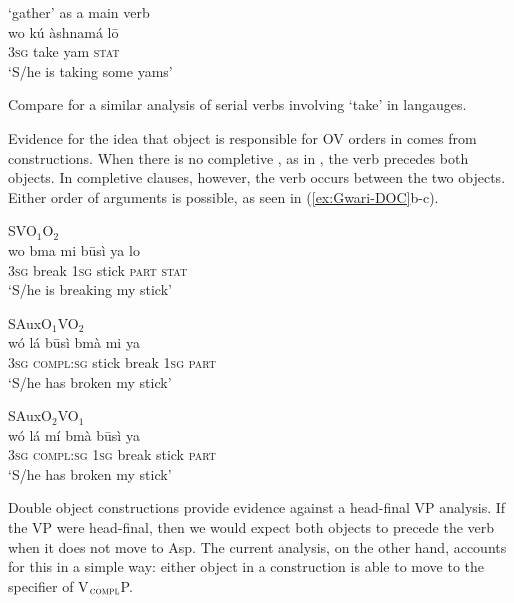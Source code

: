 \documentclass[output=paper,newtxmath,modfonts,nonflat,draftmode]{langsci/langscibook}
\begin{document}
\ex \label{ex:Gwari-gather} { `gather' as a main verb}	\\
\gll wo kú àshnamá l{\=o}\\
3\textsc{sg} take yam \textsc{stat}\\
\glt `S/he is taking some yams' \hfill \citep[][93]{hyman1970}
\z
\z

Compare \citet{aboh09} for a similar analysis of serial verbs involving `take' in  langauges.

Evidence for the idea that object  is responsible for OV orders in  comes from  constructions. When there is no completive , as in , the verb precedes both objects. In completive clauses, however, the verb occurs between the two objects. Either order of arguments is possible, as seen in (\ref{ex:Gwari-DOC}b-c). 

\ea \label{ex:Gwari-DOC}

\ea \label{ex:Gwari-DOC-VOO} {SVO$_1$O$_2$}	\\
\gll wo bma mi b\={u}sì ya lo \\
3\textsc{sg} break 1\textsc{sg} stick \textsc{part} \textsc{stat} \\
\glt `S/he is breaking my stick' \hfill \citep[][92]{hyman1970}\pagebreak

\ex \label{ex:Gwari-DOC-O1VO2} {SAuxO$_1$VO$_2$}	\\
\gll wó lá  b\={u}sì bmà mi ya \\
3\textsc{sg} \textsc{compl:sg} stick break 1\textsc{sg} \textsc{part}  \\
\glt `S/he has broken my stick' \hfill \citep[][93]{hyman1970}

\ex \label{ex:Gwari-DOC-O2VO1}{SAuxO$_2$VO$_1$}	\\
\gll wó lá mí bmà b\={u}sì ya \\
3\textsc{sg} \textsc{compl:sg} 1\textsc{sg} break stick \textsc{part} \\
\glt `S/he has broken my stick'	\hfill \citep[][93]{hyman1970}
\z

\z
Double object constructions provide evidence against a head-final VP analysis. If the  VP were head-final, then we would expect both objects to precede the verb when it does not move to Asp. The current analysis, on the other hand, accounts for this in a simple way: either object in a  construction is able to move to the specifier of V$_\textsc{compl}$P.
\end{document}
